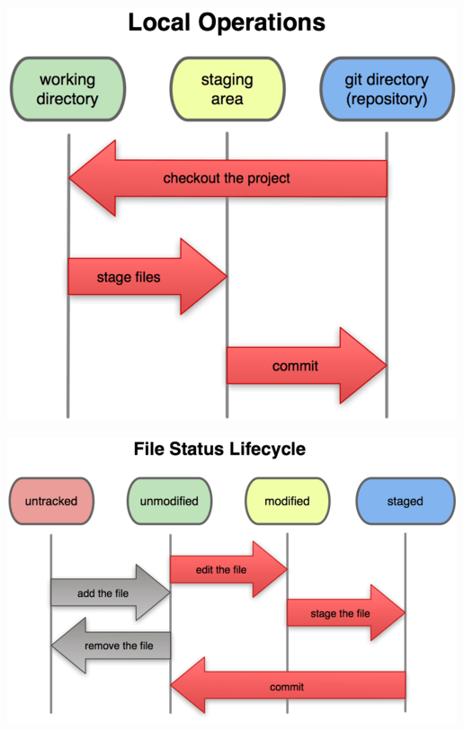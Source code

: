 \documentclass[10pt,a4paper]{beamer}
\begin{document}
\begin{frame}[plain]
\includegraphics[width=\linewidth]{threeStates.png}
\end{frame}

\begin{frame}[plain]
\includegraphics[width=\linewidth]{fileLifeCycle.png}
\end{frame}
\end{document}
